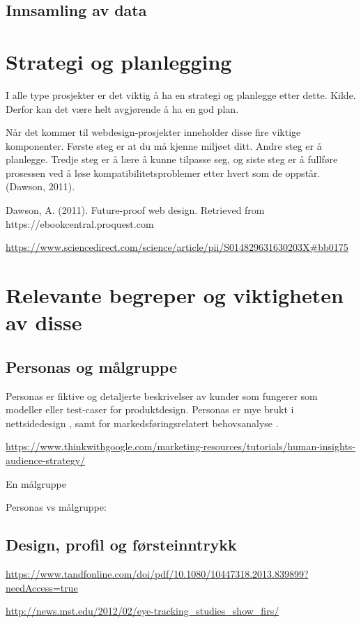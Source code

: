 \subsection{Innsamling av data}

\section{Strategi og planlegging}
I alle type prosjekter er det viktig å ha en strategi og planlegge etter dette. Kilde. Derfor kan det være helt avgjørende å ha en god plan.

Når det kommer til webdesign-prosjekter inneholder disse fire viktige komponenter. Første steg er at du må kjenne miljøet ditt. Andre steg er å planlegge. Tredje steg er å lære å kunne tilpasse seg, og siste steg er å fullføre prosessen ved å løse kompatibilitetsproblemer etter hvert som de oppstår. (Dawson, 2011).

Dawson, A. (2011). Future-proof web design. Retrieved from https://ebookcentral.proquest.com

\url{https://www.sciencedirect.com/science/article/pii/S014829631630203X#bb0175 }

\section{Relevante begreper og viktigheten av disse}

\subsection{Personas og målgruppe}

Personas er fiktive og detaljerte beskrivelser av kunder som fungerer som modeller eller test-caser for produktdesign. Personas er mye brukt i nettsidedesign , samt for markedsføringsrelatert behovsanalyse \cite[s.~130]{grenci2007mcv}.

\url{https://www.thinkwithgoogle.com/marketing-resources/tutorials/human-insights-audience-strategy/}

En målgruppe

Personas vs målgruppe:


\subsection{Design, profil og førsteinntrykk}
\url{https://www.tandfonline.com/doi/pdf/10.1080/10447318.2013.839899?needAccess=true }

\url{http://news.mst.edu/2012/02/eye-tracking_studies_show_firs/}

